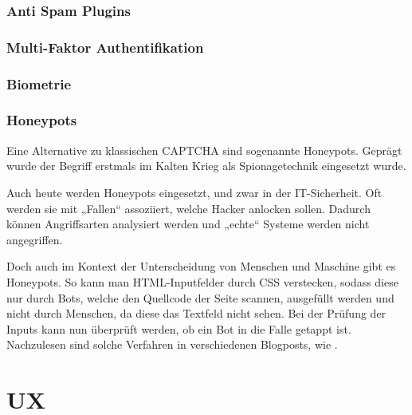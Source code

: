 \subsubsection{Anti Spam Plugins}
\subsubsection{Multi-Faktor Authentifikation}
\subsubsection{Biometrie}
\subsubsection{Honeypots}

Eine Alternative zu klassischen CAPTCHA sind sogenannte Honeypots. 
Geprägt wurde der Begriff erstmals im Kalten Krieg als Spionagetechnik eingesetzt wurde. \cite[p.2]{joshi:2011} 

Auch heute werden Honeypots eingesetzt, und zwar in der IT-Sicherheit. 
Oft werden sie mit „Fallen“ assoziiert, welche Hacker anlocken sollen. 
Dadurch können Angriffsarten analysiert werden und „echte“ Systeme werden nicht angegriffen.

Doch auch im Kontext der Unterscheidung von Menschen und Maschine gibt es Honeypots. 
So kann man HTML-Inputfelder durch CSS verstecken, sodass diese nur durch Bots, welche den Quellcode der Seite scannen, ausgefüllt werden 
und nicht durch Menschen, da diese das Textfeld nicht sehen. 
Bei der Prüfung der Inputs kann nun überprüft werden, ob ein Bot in die Falle getappt ist. 
Nachzulesen sind solche Verfahren in verschiedenen Blogposts, wie \cite{perry:2019}.


\section{UX}

